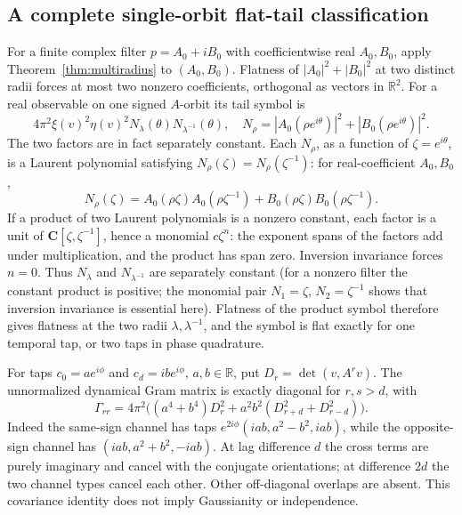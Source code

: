 \subsection{A complete single-orbit flat-tail classification}
For a finite complex filter $p=A_0+iB_0$ with coefficientwise real
$A_0,B_0$, apply Theorem~\ref{thm:multiradius} to $(A_0,B_0)$.
Flatness of $|A_0|^2+|B_0|^2$ at two distinct radii forces at most two
nonzero coefficients, orthogonal as vectors in $\mathbb R^2$.
For a real observable on one signed $A$-orbit its tail symbol is
\[
 4\pi^2\xi(v)^2\eta(v)^2
 N_\lambda(\theta)N_{\lambda^{-1}}(\theta),\quad
 N_\rho=|A_0(\rho e^{i\theta})|^2+|B_0(\rho e^{i\theta})|^2.
\]
The two factors are in fact separately constant. Each $N_\rho$, as a
function of $\zeta=e^{i\theta}$, is a Laurent polynomial satisfying
$N_\rho(\zeta)=N_\rho(\zeta^{-1})$: for real-coefficient $A_0,B_0$,
\[
 N_\rho(\zeta)
 =A_0(\rho\zeta)A_0(\rho\zeta^{-1})
  +B_0(\rho\zeta)B_0(\rho\zeta^{-1}).
\]
If a product of two Laurent polynomials is a nonzero constant, each factor
is a unit of $\mathbf C[\zeta,\zeta^{-1}]$, hence a monomial $c\zeta^n$:
the exponent spans of the factors add under multiplication, and the
product has span zero. Inversion invariance forces $n=0$. Thus
$N_\lambda$ and $N_{\lambda^{-1}}$ are separately constant (for a nonzero
filter the constant product is positive; the monomial pair
$N_1=\zeta$, $N_2=\zeta^{-1}$ shows that inversion invariance is essential
here). Flatness of the product symbol therefore gives flatness at the two
radii $\lambda,\lambda^{-1}$, and the symbol is flat exactly for one
temporal tap, or two taps in phase quadrature.

For taps $c_0=ae^{i\phi}$ and $c_d=ibe^{i\phi}$, $a,b\in\mathbb R$, put
$D_r=\det(v,A^rv)$. The unnormalized dynamical Gram matrix is exactly
diagonal for $r,s>d$, with
\[
 \Gamma_{rr}=4\pi^2\bigl((a^4+b^4)D_r^2
                  +a^2b^2(D_{r+d}^2+D_{r-d}^2)\bigr).
\]
Indeed the same-sign channel has taps
$e^{2i\phi}(iab,a^2-b^2,iab)$, while the opposite-sign channel has
$(iab,a^2+b^2,-iab)$. At lag difference $d$ the cross terms are purely
imaginary and cancel with the conjugate orientations; at difference $2d$
the two channel types cancel each other. Other off-diagonal overlaps are
absent. This covariance identity does not imply Gaussianity or independence.
